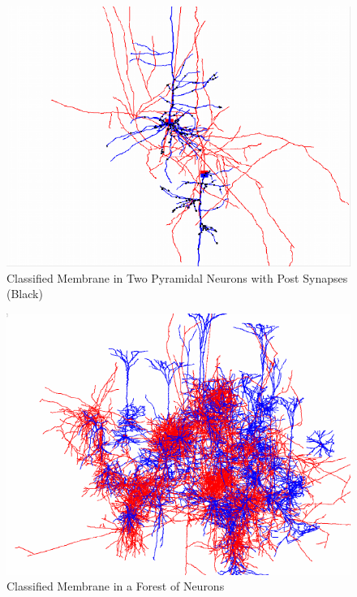 \documentclass[a4paper,11pt]{article}
\begin{document}
\begin{figure}[H] %
\caption{Classified Membrane in Two Pyramidal Neurons with Post Synapses (Black)}
\includegraphics{classify}
\end{figure}%

\begin{figure}[H]
\caption{Classified Membrane in a Forest of Neurons}
\includegraphics{pasted35}
\end{figure}

\newpage

\end{document}
